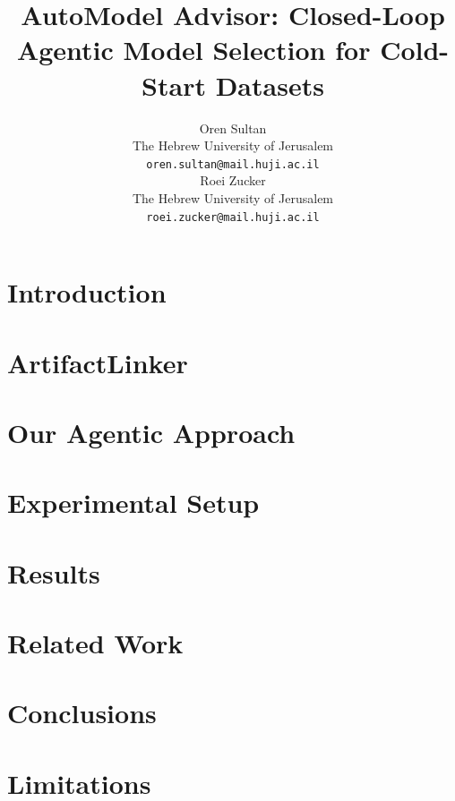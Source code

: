 \documentclass[11pt]{article}
\title{AutoModel Advisor: Closed-Loop Agentic Model Selection for Cold-Start Datasets}
\author{Oren Sultan \\
  The Hebrew University of Jerusalem \\
  \texttt{oren.sultan@mail.huji.ac.il} \\\And
  Roei Zucker \\
  The Hebrew University of Jerusalem \\
  \texttt{roei.zucker@mail.huji.ac.il} \\}
\begin{document}
\maketitle

\begin{abstract}

\end{abstract}

\section{Introduction}

\label{sec:introduction}




\section{ArtifactLinker}

\label{sec:artifact_linker}


\section{Our Agentic Approach}

\label{sec:approach}


\section{Experimental Setup}

\label{sec:experimental_setup}

\section{Results}

\label{sec:results}


\section{Related Work}

\label{sec:related_work}


\section{Conclusions}

\label{sec:conclusion}


\section*{Limitations}



\end{document}
